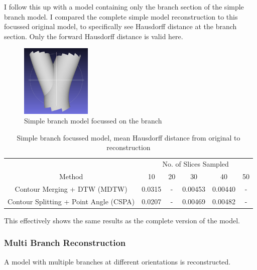\documentclass[11p, titlepage]{article}
\begin{document}
I follow this up with a model containing only the branch section of the simple branch model. I compared the complete simple model reconstruction to this focussed original model, to specifically see Hausdorff distance at the branch section. Only the forward Hausdorff distance is valid here.

\begin{figure}[h!]
\centering
\includegraphics[width=0.3\textwidth]{originals/simple-branch-2-6}
\caption{Simple branch model focussed on the branch\label{fig:simple_branch_focussed}}
\end{figure}

\begin{table}[h!]
\begin{tabular}{ | c | c | c | c | c | c | }
\hline
& \multicolumn{5}{c|}{No. of Slices Sampled} \\
\cline{2-6}
Method & 10 & 20 & 30 & 40 & 50 \\
\hline
Contour Merging + DTW (MDTW) & 0.0315 & - & 0.00453 & 0.00440 & - \\
Contour Splitting + Point Angle (CSPA) & 0.0207 & - & 0.00469 & 0.00482 & - \\
\hline
\end{tabular}
\caption{Simple branch focussed model, mean Hausdorff distance from original to reconstruction}
\label{table:simple_branch_focussed_forward}
\end{table}

This effectively shows the same results as the complete version of the model. 
\pagebreak

\subsubsection{Multi Branch Reconstruction}

A model with multiple branches at different orientations is reconstructed.
\end{document}
